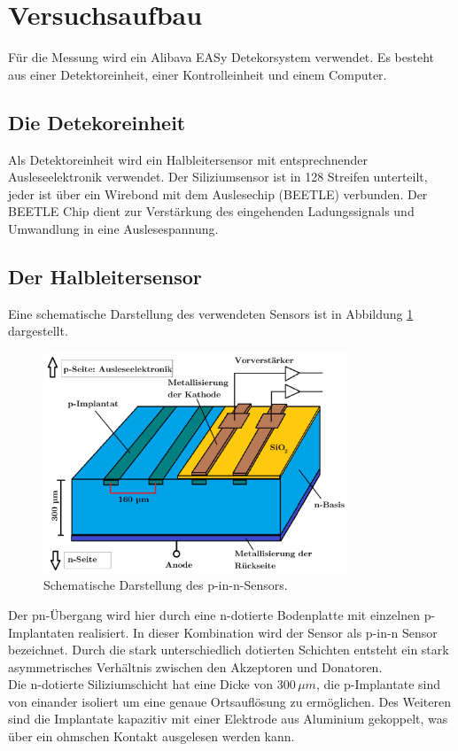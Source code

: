 \section{Versuchsaufbau}
\label{sec:Versuchaufbau}
Für die Messung wird ein Alibava EASy Detekorsystem verwendet. Es
besteht aus einer Detektoreinheit, einer
Kontrolleinheit und einem Computer.
\subsection{Die Detekoreinheit}
Als Detektoreinheit wird ein Halbleitersensor mit
entsprechnender Ausleseelektronik verwendet.
Der Siliziumsensor ist in 128 Streifen unterteilt, jeder ist über
ein Wirebond mit dem Auslesechip (BEETLE) verbunden. Der
BEETLE Chip dient zur Verstärkung des eingehenden Ladungssignals und Umwandlung in eine Auslesespannung.\\
\subsection{Der Halbleitersensor}
Eine schematische Darstellung des verwendeten Sensors ist in Abbildung
\ref{sensor} dargestellt.
\begin{figure}[H]
  \centering
  \includegraphics[width=0.81\textwidth]{ressources/sensor.png}
  \caption{Schematische Darstellung des p-in-n-Sensors. \cite{skript}}
  \label{sensor}
\end{figure}
Der pn-Übergang wird hier durch eine n-dotierte Bodenplatte
mit einzelnen p-Implantaten realisiert. In dieser Kombination wird der Sensor als p-in-n Sensor bezeichnet. Durch die stark unterschiedlich dotierten Schichten entsteht ein stark asymmetrisches Verhältnis zwischen den Akzeptoren und Donatoren. \\
Die n-dotierte Siliziumschicht hat eine Dicke von $300\,\mu m$, die p-Implantate sind von einander isoliert um eine
genaue Ortsauflösung zu ermöglichen. Des Weiteren sind die Implantate
kapazitiv mit einer Elektrode aus Aluminium gekoppelt, was über ein ohmschen Kontakt
ausgelesen werden kann.



